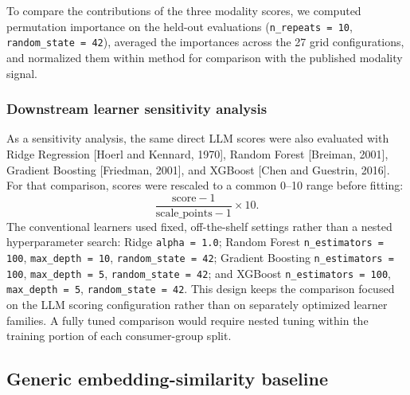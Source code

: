 \documentclass[11pt]{article}
\begin{document}
To compare the contributions of the three modality scores, we computed
permutation importance on the held-out evaluations
(\texttt{n\_repeats = 10}, \texttt{random\_state = 42}), averaged the
importances across the 27 grid configurations, and normalized them within
method for comparison with the published modality signal.

\subsubsection{Downstream learner sensitivity analysis}
\label{sec:learners}

As a sensitivity analysis, the same direct LLM scores were also evaluated with
Ridge Regression [Hoerl and Kennard, 1970], Random Forest [Breiman, 2001],
Gradient Boosting [Friedman, 2001], and XGBoost [Chen and Guestrin, 2016]. For
that comparison, scores were rescaled to a common 0--10 range before fitting:
\[
\frac{\mathrm{score} - 1}{\mathrm{scale\_points} - 1} \times 10.
\]
The conventional learners used fixed, off-the-shelf settings rather than a
nested hyperparameter search: Ridge \texttt{alpha = 1.0}; Random Forest
\texttt{n\_estimators = 100}, \texttt{max\_depth = 10},
\texttt{random\_state = 42}; Gradient Boosting \texttt{n\_estimators = 100},
\texttt{max\_depth = 5}, \texttt{random\_state = 42}; and XGBoost
\texttt{n\_estimators = 100}, \texttt{max\_depth = 5},
\texttt{random\_state = 42}. This design keeps the comparison focused on the
LLM scoring configuration rather than on separately optimized learner
families. A fully tuned comparison would require nested tuning within the
training portion of each consumer-group split.

\subsection{Generic embedding-similarity baseline}
\label{sec:embedding}
\end{document}
